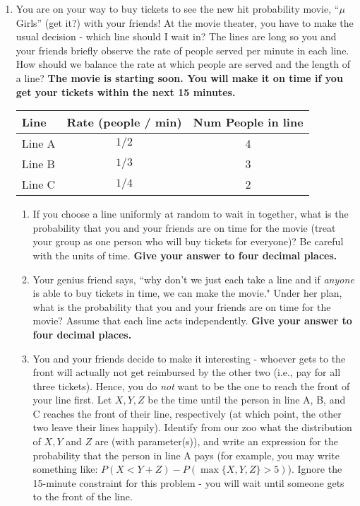 \documentclass[12pt]{article}
\renewcommand{\|}{\mid}
\begin{document}
\begin{enumerate}
\item You are on your way to buy tickets to see the new hit probability movie, ``$\mu$ Girls'' (get it?) with your friends! At the movie theater, you have to make
the usual decision - which line should I wait in? The lines are long so you and your friends briefly observe the rate of people served per minute in each line. How should we balance the rate at which people are served and the length of a line? \textbf{The movie is starting soon. You will make it on time if you get your tickets within the next 15 minutes.}
\begin{table}[h!]
    \centering
    \begin{tabular}{lcc}
    \toprule
    \textbf{Line} 
    & \textbf{Rate} (people / min)
    & \textbf{Num People in line} \\
    \midrule
        Line A    
        & $1/2$ 
        & 4\\
        Line B  
        & $1/3$ 
        & 3\\
        Line C 
        & $1/4$ 
        & 2\\
    \bottomrule
    \end{tabular}
\end{table}
\begin{enumerate}
    \item If you choose a line uniformly at random to wait in together, what is the probability that you and your friends are on time for the movie (treat your group as one person who will buy tickets for everyone)? Be careful with the units of time.  \textbf{Give your answer to four decimal places.}
    \item Your genius friend says, ``why don't we just each take a line and if \emph{anyone} is able to buy tickets in time, we can make the movie."  Under her plan, what is the probability that you and your friends are on time for the movie? Assume that each line acts independently. \textbf{Give your answer to four decimal places.}
    \item You and your friends decide to make it interesting - whoever gets to the front will actually not get reimbursed by the other two (i.e., pay for all three tickets). Hence, you do \textit{not} want to be the one to reach the front of your line first. Let $X,Y,Z$ be the time until the person in line A, B, and C reaches the front of their line, respectively (at which point, the other two leave their lines happily). Identify from our zoo what the distribution of $X,Y$ and $Z$ are (with parameter(s)), and write an expression for the probability that the person in line A pays (for example, you may write something like: $P(X<Y+Z)-P(\max\{X,Y,Z\}>5)$). Ignore the 15-minute constraint for this problem - you will wait until someone gets to the front of the line.

\end{enumerate}
\end{enumerate}
\end{document}
